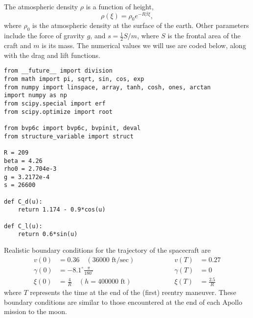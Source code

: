 The atmospheric density $\rho$ is a function of height,
\[\rho(\xi) = \rho_0e^{-R\beta\xi},
\] where  $\rho_0$ is the atmospheric density at the surface of the earth.
Other parameters include the force of gravity $g$, and $s = \frac{1}{2}S/m$, where $S$ is the frontal area of the craft and $m$ is its mass.
The numerical values we will use are coded below, along with the drag and lift functions.
\begin{lstlisting}
from __future__ import division
from math import pi, sqrt, sin, cos, exp
from numpy import linspace, array, tanh, cosh, ones, arctan
import numpy as np
from scipy.special import erf
from scipy.optimize import root

from bvp6c import bvp6c, bvpinit, deval
from structure_variable import struct

R = 209
beta = 4.26
rho0 = 2.704e-3
g = 3.2172e-4
s = 26600

def C_d(u):
	return 1.174 - 0.9*cos(u)

def C_l(u):
	return 0.6*sin(u)
\end{lstlisting}

Realistic boundary conditions for the trajectory of the spacecraft are
\begin{equation}
  \begin{split}
    v(0) &= 0.36 \quad (36000 \text{ ft/sec})\\
    \gamma(0) &= -8.1^\circ \frac{\pi}{180^\circ}\\
    \xi(0)&= \frac{4}{R}\quad (h = 400000 \text{ ft})
  \end{split}
\quad \quad \quad \quad \quad
  \begin{split}
    v(T) &= 0.27\\
    \gamma(T) &= 0 \\
	\xi(T)&= \frac{2.5}{R}
  \end{split} \label{eqn:reentry:BCs}
\end{equation}
where $T$ represents the time at the end of the (first) reentry maneuver.
These boundary conditions are similar to those encountered at the end of each Apollo mission to the moon.

